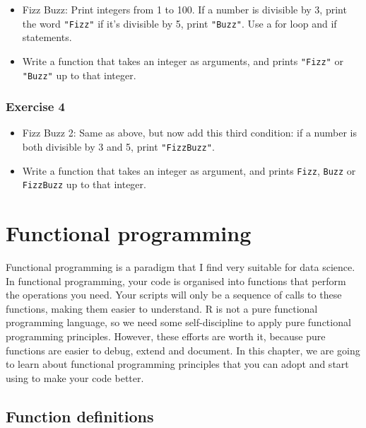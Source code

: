 \documentclass[
]{article}
\begin{document}
\begin{itemize}
\item
  Fizz Buzz: Print integers from 1 to 100. If a number is divisible by 3, print the word \texttt{"Fizz"} if
  it's divisible by 5, print \texttt{"Buzz"}. Use a for loop and if statements.
\item
  Write a function that takes an integer as arguments, and prints \texttt{"Fizz"} or \texttt{"Buzz"} up to that integer.
\end{itemize}

\hypertarget{exercise-4-2}{%
\subsubsection*{Exercise 4}\label{exercise-4-2}}

\begin{itemize}
\item
  Fizz Buzz 2: Same as above, but now add this third condition: if a number is both divisible by 3 and 5, print \texttt{"FizzBuzz"}.
\item
  Write a function that takes an integer as argument, and prints \texttt{Fizz}, \texttt{Buzz} or \texttt{FizzBuzz} up to that integer.
\end{itemize}

\hypertarget{functional-programming}{%
\section{Functional programming}\label{functional-programming}}

Functional programming is a paradigm that I find very suitable for data science. In functional
programming, your code is organised into functions that perform the operations you need. Your scripts
will only be a sequence of calls to these functions, making them easier to understand. R is not a pure
functional programming language, so we need some self-discipline to apply pure functional programming
principles. However, these efforts are worth it, because pure functions are easier to debug, extend
and document. In this chapter, we are going to learn about functional programming principles that you
can adopt and start using to make your code better.

\hypertarget{function-definitions}{%
\subsection{Function definitions}\label{function-definitions}}
\end{document}
